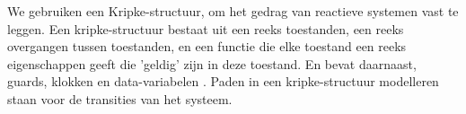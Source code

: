 \documentclass{article}
\begin{document}
%	
%	
	
	We gebruiken een Kripke-structuur, om  het gedrag van reactieve systemen vast te leggen. Een kripke-structuur bestaat uit een reeks toestanden, een reeks overgangen tussen toestanden, en een functie die elke toestand een reeks eigenschappen geeft die 'geldig' zijn in deze toestand. En bevat daarnaast, guards, klokken en data-variabelen .	
	Paden in een kripke-structuur modelleren staan voor de transities van het systeem.
	  
	
	 
	
	
\end{document}
